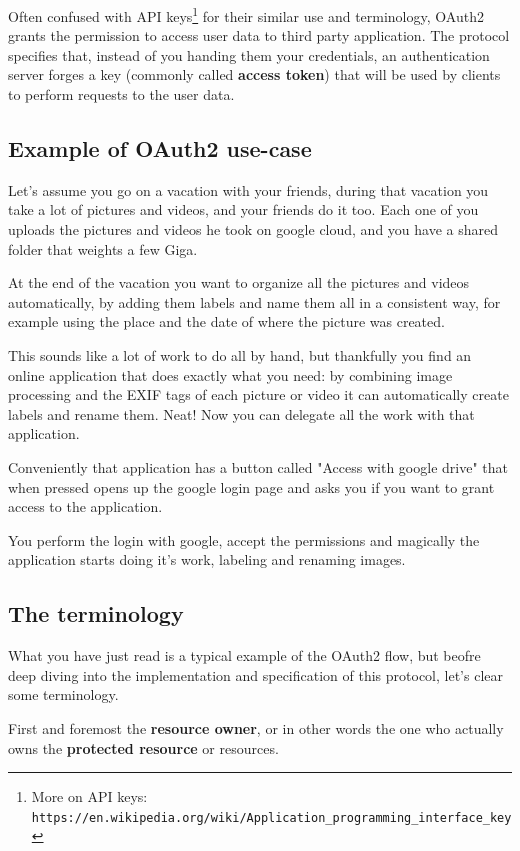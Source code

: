 \documentclass[11pt]{style}
\begin{document}
Often confused with API
keys\footnote{More on API keys:
\texttt{https://en.wikipedia.org/wiki/Application\_programming\_interface\_key}}
for their similar use and terminology, OAuth2 grants the permission to access
user data to third party application.
The protocol specifies that, instead of you handing them your credentials, an
authentication server forges a key (commonly called \textbf{access token}) that
will be used by clients to perform requests to the user data.

\subsection{Example of OAuth2 use-case}

Let's assume you go on a vacation with your friends, during that vacation you
take a lot of pictures and videos, and your friends do it too.
Each one of you uploads the pictures and videos he took on google cloud, and
you have a shared folder that weights a few Giga.

At the end of the vacation you want to organize all the pictures and videos
automatically, by adding them labels and name them all in a consistent way, for
example using the place and the date of where the picture was created.

This sounds like a lot of work to do all by hand, but thankfully you find an
online application that does exactly what you need: by combining image
processing and the EXIF tags of each picture or video it can automatically
create labels and rename them. Neat! Now you can delegate all the work with that
application.

Conveniently that application has a button called "Access with google drive"
that when pressed opens up the google login page and asks you if you want to
grant access to the application.

You perform the login with google, accept the permissions and magically the
application starts doing it's work, labeling and renaming images.

\subsection{The terminology}
What you have just read is a typical example of the OAuth2 flow, but beofre deep
diving into the implementation and specification of this protocol, let's clear
some terminology.

First and foremost the \textbf{resource owner}, or in other words the one who
actually owns the \textbf{protected resource} or resources.
\end{document}
